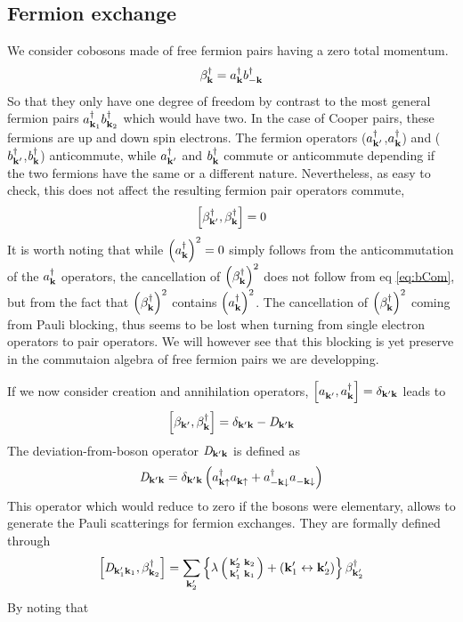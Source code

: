\documentclass[aps,prb,amsmath,amssymb,preprint,superscriptaddress]{revtex4-1}
\begin{document}
\subsection{Fermion exchange}
We consider cobosons made of free fermion pairs having a zero total momentum. 
\begin{equation}
\beta^{\dagger}_{\mathbf{k}}=a^{\dagger}_{\mathbf{k}}b^{\dagger}_{-\mathbf{k}}
\end{equation}
So that they only have one degree of freedom by contrast to the most general fermion pairs $a^{\dagger}_{\mathbf{k}_1}b^{\dagger}_{\mathbf{k}_2}$ which would have two.  In the case of Cooper pairs, these fermions are up and down spin electrons.  The fermion operators ($a^{\dagger}_{\mathbf{k}'}$,$a^{\dagger}_{\mathbf{k}}$) and ($b^{\dagger}_{\mathbf{k}'}$,$b^{\dagger}_{\mathbf{k}}$) anticommute, while $a^{\dagger}_{\mathbf{k}'}$ and $b^{\dagger}_{\mathbf{k}}$ commute or anticommute depending if the two fermions have the same or a different nature.  Nevertheless, as easy to check, this does not affect the resulting fermion pair operators commute,
\begin{equation}\label{eq:bCom}
\left[\beta^{\dagger}_{\mathbf{k}'},\beta^{\dagger}_{\mathbf{k}}\right]=0
\end{equation}
It is worth noting that while $\left(a^{\dagger}_{\mathbf{k}}\right)^2=0$ simply follows from  the anticommutation of the $a^{\dagger}_{\mathbf{k}}$ operators, the cancellation of $\left(\beta^{\dagger}_{\mathbf{k}}\right)^2$ does not follow from eq \eqref{eq:bCom}, but from the fact that  $\left(\beta^{\dagger}_{\mathbf{k}}\right)^2$ contains $\left(a^{\dagger}_{\mathbf{k}{}}\right)^2$.  The cancellation of $\left(\beta^{\dagger}_{\mathbf{k}}\right)^2$ coming from Pauli blocking, thus seems to be lost when turning from single electron operators  to pair operators. We will however see  that this blocking is yet preserve in the commutaion  algebra of free fermion pairs we are developping. 

If we now consider creation and annihilation operators, $\left[a^{}_{\mathbf{k}'},a^{\dagger}_{\mathbf{k}{}}\right]=\delta_{\mathbf{k}'\mathbf{k}}$ leads to 
\begin{equation}\label{eq:betacom}
\left[\beta_{\mathbf{k}'},\beta^{\dagger}_{\mathbf{k}}\right]=\delta_{\mathbf{k}'\mathbf{k}}-\mathit{D}_{\mathbf{k}'\mathbf{k}}
\end{equation}
The deviation-from-boson operator $\mathit{D}_{\mathbf{k}'\mathbf{k}}$ is defined as
\begin{equation}\label{eq:D}
\mathit{D}_{\mathbf{k}'\mathbf{k}}=\delta_{\mathbf{k}'\mathbf{k}}\left(a^{\dagger}_{\mathbf{k}\uparrow}a^{}_{\mathbf{k}\uparrow}+a^{\dagger}_{-\mathbf{k}\downarrow}a^{}_{-\mathbf{k}\downarrow}\right)
\end{equation}
This operator  which would reduce to  zero if the bosons were elementary,  allows to generate the Pauli scatterings for fermion exchanges.  They are formally defined through
\begin{equation}
\left[\mathit{D}_{\mathbf{k}'_1\mathbf{k}_1},\beta^{\dagger}_{\mathbf{k}_2}\right]=\sum_{\mathbf{k}'_2}\left\{\lambda\left(\begin{smallmatrix}\mathbf{k}'_2&\mathbf{k}_2\\\mathbf{k}'_1&\mathbf{k}_1\end{smallmatrix}\right)+\left(\mathbf{k}'_1\leftrightarrow\mathbf{k}'_2\right)\right\}\beta^{\dagger}_{\mathbf{k}'_2}
\end{equation}
By noting that
\end{document}
